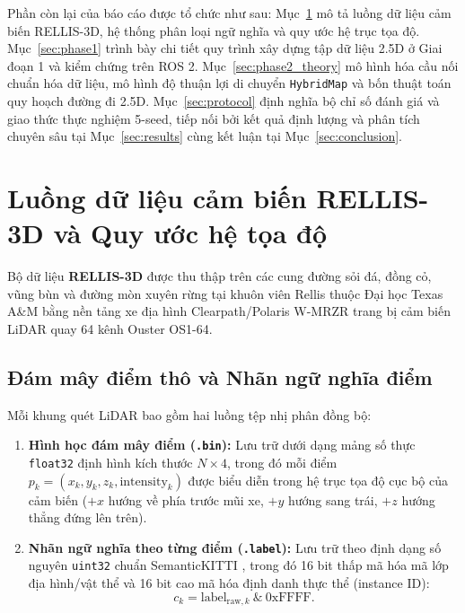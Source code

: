 \documentclass[a4paper,fleqn]{cas-sc}
\begin{document}
Phần còn lại của báo cáo được tổ chức như sau: Mục~\ref{sec:rellis_stream} mô tả luồng dữ liệu cảm biến RELLIS-3D, hệ thống phân loại ngữ nghĩa và quy ước hệ trục tọa độ. Mục~\ref{sec:phase1} trình bày chi tiết quy trình xây dựng tập dữ liệu 2.5D ở Giai đoạn 1 và kiểm chứng trên ROS 2. Mục~\ref{sec:phase2_theory} mô hình hóa cầu nối chuẩn hóa dữ liệu, mô hình độ thuận lợi di chuyển \texttt{HybridMap} và bốn thuật toán quy hoạch đường đi 2.5D. Mục~\ref{sec:protocol} định nghĩa bộ chỉ số đánh giá và giao thức thực nghiệm 5-seed, tiếp nối bởi kết quả định lượng và phân tích chuyên sâu tại Mục~\ref{sec:results} cùng kết luận tại Mục~\ref{sec:conclusion}.

\section{Luồng dữ liệu cảm biến RELLIS-3D và Quy ước hệ tọa độ}
\label{sec:rellis_stream}

Bộ dữ liệu \textbf{RELLIS-3D} \citep{pengjiang2020} được thu thập trên các cung đường sỏi đá, đồng cỏ, vũng bùn và đường mòn xuyên rừng tại khuôn viên Rellis thuộc Đại học Texas A\&M bằng nền tảng xe địa hình Clearpath/Polaris W-MRZR trang bị cảm biến LiDAR quay 64 kênh Ouster OS1-64.

\subsection{Đám mây điểm thô và Nhãn ngữ nghĩa điểm}
\label{subsec:raw_data}
Mỗi khung quét LiDAR bao gồm hai luồng tệp nhị phân đồng bộ:
\begin{enumerate}
    \item \textbf{Hình học đám mây điểm (\texttt{.bin}):} Lưu trữ dưới dạng mảng số thực \texttt{float32} định hình kích thước $N \times 4$, trong đó mỗi điểm $p_k = (x_k, y_k, z_k, \text{intensity}_k)$ được biểu diễn trong hệ trục tọa độ cục bộ của cảm biến ($+x$ hướng về phía trước mũi xe, $+y$ hướng sang trái, $+z$ hướng thẳng đứng lên trên).
    \item \textbf{Nhãn ngữ nghĩa theo từng điểm (\texttt{.label}):} Lưu trữ theo định dạng số nguyên \texttt{uint32} chuẩn SemanticKITTI \citep{behley2019iccv}, trong đó 16 bit thấp mã hóa mã lớp địa hình/vật thể và 16 bit cao mã hóa định danh thực thể (instance ID):
    \begin{equation}
        c_k = \text{label}_{\text{raw}, k} \ \& \ \text{0xFFFF}.
    \end{equation}
\end{enumerate}
\end{document}
